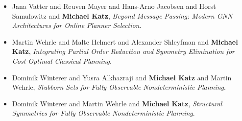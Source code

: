\begin{itemize}[noitemsep]
\item Jana Vatter and Reuven Mayer and Hans-Arno Jacobsen and Horst Samulowitz and {\bf Michael Katz}, {\it Beyond Message Passing: Modern GNN Architectures for Online Planner Selection}.
\item Martin Wehrle and Malte Helmert and Alexander Shleyfman and {\bf Michael Katz}, {\it Integrating Partial Order Reduction and Symmetry Elimination for Cost-Optimal Classical Planning}.
\item Dominik Winterer and Yusra Alkhazraji and {\bf Michael Katz} and Martin Wehrle, {\it Stubborn Sets for Fully Observable Nondeterministic Planning}.
\item Dominik Winterer and Martin Wehrle and {\bf Michael Katz}, {\it Structural Symmetries for Fully Observable Nondeterministic Planning}.
\end{itemize}
